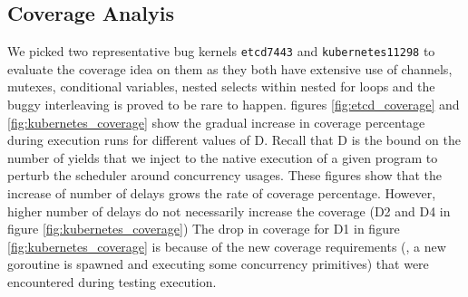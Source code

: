 \subsection{Coverage Analyis}
We picked two representative bug kernels \texttt{etcd7443} and \texttt{kubernetes11298} to evaluate the coverage idea on them as they
%
both have extensive use of channels, mutexes, conditional variables, nested selects within nested for loops and the buggy interleaving is proved to be rare to happen.
%
figures \ref{fig:etcd_coverage} and \ref{fig:kubernetes_coverage} show the gradual increase in coverage percentage during execution runs for different values of D.
%
Recall that D is the bound on the number of yields that we inject to the native execution of a given program to perturb the scheduler around concurrency usages.
%
These figures show that the increase of number of delays grows the rate of coverage percentage.
%
However, higher number of delays do not necessarily increase the coverage (D2 and D4 in figure \ref{fig:kubernetes_coverage})
%
The drop in coverage for D1 in figure \ref{fig:kubernetes_coverage} is because of the new coverage requirements (\eg, a new goroutine is spawned and executing some concurrency primitives) that were encountered during testing execution.
